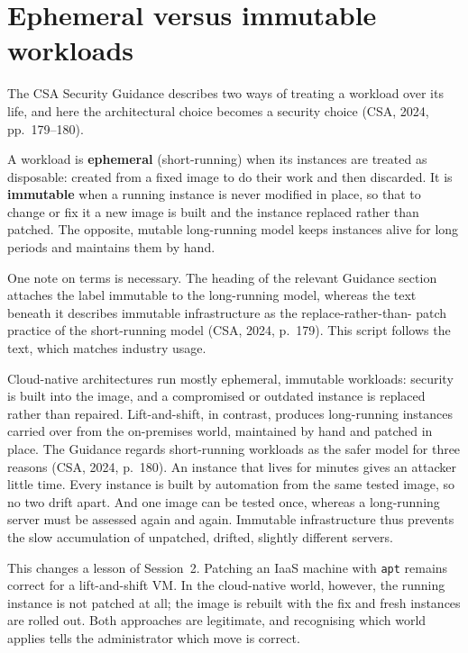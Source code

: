 \section{Ephemeral versus immutable workloads}

The CSA Security Guidance describes two ways of treating a workload over its
life, and here the architectural choice becomes a security choice (CSA,
2024, pp.~179--180).

\begin{definition}\label{def:immutable}
A workload is \textbf{ephemeral} (short-running) when its instances are
treated as disposable: created from a fixed image to do their work and then
discarded. It is \textbf{immutable} when a running instance is never modified
in place, so that to change or fix it a new image is built and the instance
replaced rather than patched. The opposite, mutable long-running model keeps
instances alive for long periods and maintains them by hand.
\end{definition}

One note on terms is necessary. The heading of the relevant Guidance section
attaches the label immutable to the long-running model, whereas the text
beneath it describes immutable infrastructure as the replace-rather-than-
patch practice of the short-running model (CSA, 2024, p.~179). This script
follows the text, which matches industry usage.

Cloud-native architectures run mostly ephemeral, immutable workloads:
security is built into the image, and a compromised or outdated instance is
replaced rather than repaired. Lift-and-shift, in contrast, produces
long-running instances carried over from the on-premises world, maintained
by hand and patched in place. The Guidance regards short-running workloads
as the safer model for three reasons (CSA, 2024, p.~180). An instance that
lives for minutes gives an attacker little time. Every instance is built by
automation from the same tested image, so no two drift apart. And one image
can be tested once, whereas a long-running server must be assessed again and
again. Immutable infrastructure thus prevents the slow accumulation of
unpatched, drifted, slightly different servers.

This changes a lesson of Session~2. Patching an IaaS machine with
\texttt{apt} remains correct for a lift-and-shift VM. In the cloud-native
world, however, the running instance is not patched at all; the image is
rebuilt with the fix and fresh instances are rolled out. Both approaches are
legitimate, and recognising which world applies tells the administrator
which move is correct.

